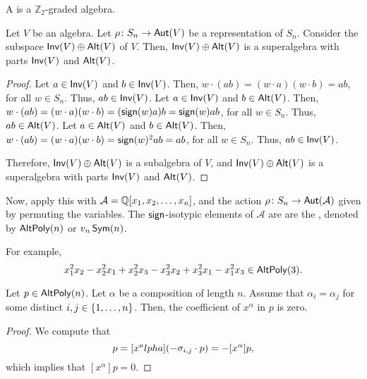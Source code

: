 A  is a \(\mathbb{Z}_2\)-graded algebra.

\begin{theorem} \label{thm:inv-alt-super}
    Let \(V\) be an algebra.
    Let \(\rho \colon S_n \to \operatorname{\mathsf{Aut}}(V)\) be a representation of \(S_n\).
    Consider the subspace \(\operatorname{\mathsf{Inv}}(V) \oplus \operatorname{\mathsf{Alt}}(V)\) of \(V\).
    Then, \(\operatorname{\mathsf{Inv}}(V) \oplus \operatorname{\mathsf{Alt}}(V)\) is a superalgebra with parts \(\operatorname{\mathsf{Inv}}(V)\) and \(\operatorname{\mathsf{Alt}}(V)\).
\end{theorem}

\begin{proof}
    Let \(a \in \operatorname{\mathsf{Inv}}(V)\) and \(b \in \operatorname{\mathsf{Inv}}(V)\).
    Then, \(w \cdot (ab) = (w \cdot a) (w \cdot b) = a b\), for all \(w \in S_n\).
    Thus, \(ab \in \operatorname{\mathsf{Inv}}(V)\).
    Let \(a \in \operatorname{\mathsf{Inv}}(V)\) and \(b \in \operatorname{\mathsf{Alt}}(V)\).
    Then, \(w \cdot (ab) = (w \cdot a) (w \cdot b) = (\operatorname{\mathsf{sign}}(w) a) b = \operatorname{\mathsf{sign}}(w) a b\), for all \(w \in S_n\).
    Thus, \(ab \in \operatorname{\mathsf{Alt}}(V)\).
    Let \(a \in \operatorname{\mathsf{Alt}}(V)\) and \(b \in \operatorname{\mathsf{Alt}}(V)\).
    Then, \(w \cdot (ab) = (w \cdot a) (w \cdot b) = \operatorname{\mathsf{sign}}(w)^2 a b = a b\), for all \(w \in S_n\).
    Thus, \(ab \in \operatorname{\mathsf{Inv}}(V)\).

    Therefore, \(\operatorname{\mathsf{Inv}}(V) \oplus \operatorname{\mathsf{Alt}}(V)\) is a subalgebra of \(V\),
    and \(\operatorname{\mathsf{Inv}}(V) \oplus \operatorname{\mathsf{Alt}}(V)\) is a superalgebra with parts \(\operatorname{\mathsf{Inv}}(V)\) and \(\operatorname{\mathsf{Alt}}(V)\).
\end{proof}

Now, apply this with \(\mathcal{A} = \mathbb{Q}[x_1, x_2, \ldots, x_n]\),
and the action \(\rho \colon S_n \to \operatorname{\mathsf{Aut}}(\mathcal{A})\) given by
permuting the variables.
The \(\operatorname{\mathsf{sign}}\)-isotypic elements of \(\mathcal{A}\) are are the ,
denoted by \(\operatorname{\mathsf{AltPoly}}(n)\) or \(v_n\operatorname{\mathsf{Sym}}(n)\).

For example,
\begin{equation}
    x_1^2x_2 - x_2^2x_1 + x_2^2x_3 - x_3^2x_2 + x_3^2x_1 - x_1^2x_3 \in \operatorname{\mathsf{AltPoly}}(3).
\end{equation}

\begin{lemma}
Let \(p \in \operatorname{\mathsf{AltPoly}}(n)\).
Let \(\alpha\) be a composition of length \(n\).
Assume that \(\alpha_i = \alpha_j\) for some distinct \(i, j \in \interval{n}\).
Then, the coefficient of \(x^\alpha\) in \(p\) is zero.
\end{lemma}

\begin{proof}
    We compute that     
    \begin{equation}
        [x^\alpha] p = [x^alpha] (- \eltr{i, j} \cdot p) = - [x^\alpha] p,
    \end{equation}
    which implies that \([x^\alpha] p = 0\).
\end{proof}

